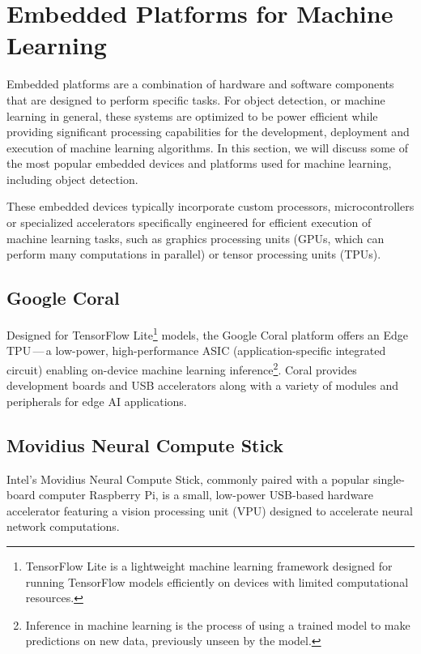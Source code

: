 \section{Embedded Platforms for Machine Learning}

Embedded platforms are a combination of hardware and software components that
are designed to perform specific tasks. For object detection, or machine
learning in general, these systems are optimized to be power efficient while
providing significant processing capabilities for the development, deployment and
execution of machine learning algorithms. In this section, we will discuss some
of the most popular embedded devices and platforms used for machine learning,
including object detection.

These embedded devices typically incorporate custom processors, microcontrollers
or specialized accelerators specifically engineered for efficient execution of
machine learning tasks, such as graphics processing units (GPUs, which can
perform many computations in parallel) or tensor processing units (TPUs).

\subsection{Google Coral}

Designed for TensorFlow Lite\footnote{TensorFlow Lite is a lightweight machine
learning framework designed for running TensorFlow models efficiently on devices
with limited computational resources.} models, the Google Coral platform offers
an Edge TPU\,---\,a low-power, high-performance ASIC (application-specific
integrated circuit) enabling on-device machine learning
inference\footnote{Inference in machine learning is the process of using a
trained model to make predictions on new data, previously unseen by the model.}.
Coral provides development boards and USB accelerators along with a variety of
modules and peripherals for edge AI applications.


\subsection{Movidius Neural Compute Stick}

Intel's Movidius Neural Compute Stick, commonly paired with a popular
single-board computer Raspberry Pi, is a small, low-power USB-based hardware
accelerator featuring a vision processing unit (VPU) designed to accelerate
neural network computations.


